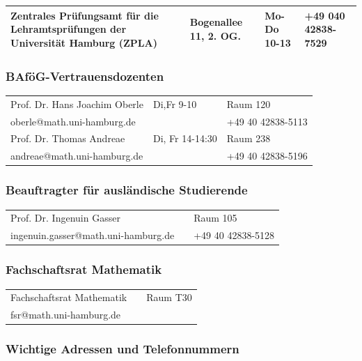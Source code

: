\documentclass[11pt,a4paper,oneside,landscape]{article}
\begin{document}
\begin{tabularx}{\textwidth}{|X|X|X|X|}
\hline Zentrales Prüfungsamt für die Lehramtsprüfungen der Universität Hamburg (ZPLA)&Bogenallee 11, 2. OG.&Mo-Do \hfill 10-13
    &+49 040 42838-7529\\
\hline
\end{tabularx}


\subsubsection{BAföG-Vertrauensdozenten}

\begin{tabularx}{\textwidth}{|X|X|X|}
\hline Prof. Dr. Hans Joachim Oberle&Di,Fr \hfill 9-10&Raum 120\\
       oberle@math.uni-hamburg.de&&+49 40 42838-5113\\
\hline Prof. Dr. Thomas Andreae&Di, Fr \hfill 14-14:30&Raum 238\\
       andreae@math.uni-hamburg.de&&+49 40 42838-5196\\
\hline
\end{tabularx}

\subsubsection{Beauftragter für ausländische Studierende}
\begin{tabularx}{\textwidth}{|X|X|X|}
\hline Prof. Dr. Ingenuin Gasser& \hfill &Raum 105\\
       ingenuin.gasser@math.uni-hamburg.de&&+49 40 42838-5128\\
\hline
\end{tabularx}

\subsubsection{Fachschaftsrat Mathematik}

\begin{tabularx}{\textwidth}{|X|X|X|}
\hline Fachschaftsrat Mathematik&&Raum T30\\
       fsr@math.uni-hamburg.de&&\\
\hline
\end{tabularx}

\subsubsection{Wichtige Adressen und Telefonnummern}
\end{document}
